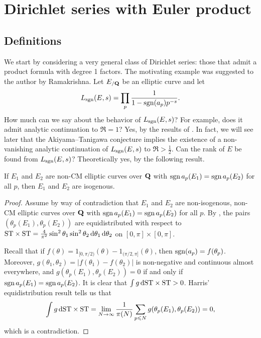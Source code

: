 
\chapter{Dirichlet series with Euler product}\label{ch:Dirichlet-series}





\section{Definitions}

We start by considering a very general class of Dirichlet series: those that 
admit a product formula with degree 1 factors. The motivating example was 
suggested to the author by Ramakrishna. Let $E_{/\mathbf{Q}}$ be an elliptic 
curve and let 
\[
	L_{\operatorname{sgn}}(E,s) = \prod_p \frac{1}{1-\operatorname{sgn}(a_p) p^{-s}} .
\]
How much can we say about the behavior of $L_{\operatorname{sgn}}(E,s)$? For example, does it 
admit analytic continuation to $\Re = 1$? Yes, by the results of 
\cite[A.2]{serre-1989}. In fact, we will see later that the Akiyama--Tanigawa 
conjecture implies the existence of a non-vanishing analytic continuation of 
$L_{\operatorname{sgn}}(E,s)$ to $\Re > \frac 1 2$. Can the rank of $E$ be 
found from $L_{\operatorname{sgn}}(E,s)$? Theoretically yes, by the following result. 

\begin{theorem}
If $E_1$ and $E_2$ are non-CM elliptic curves over $\mathbf{Q}$ with 
$\operatorname{sgn} a_p(E_1) = \operatorname{sgn} a_p(E_2)$ for all $p$, then $E_1$ and $E_2$ are 
isogenous.
\end{theorem}
\begin{proof}
Assume by way of contradiction that $E_1$ and $E_2$ are non-isogenous, non-CM 
elliptic curves over $\mathbf{Q}$ with $\operatorname{sgn} a_p(E_1) = \operatorname{sgn} a_p(E_2)$ for all $p$. By 
\cite[5.4]{harris-2009}, the pairs $(\theta_p(E_1),\theta_p(E_2))$ are 
equidistributed with respect to 
$\mathrm{ST}\times \mathrm{ST} = \frac{4}{\pi^2} \sin^2\theta_1\sin^2\theta_2\, \mathrm{d}\theta_1\, \mathrm{d}\theta_2$ 
on $[0,\pi]\times [0,\pi]$. 

Recall that if $f(\theta) = 1_{[0,\pi/2)}(\theta) - 1_{(\pi/2,\pi]}(\theta)$, 
then $\operatorname{sgn}(a_p) = f(\theta_p)$. Moreover, 
$g(\theta_1,\theta_2) = |f(\theta_1) - f(\theta_2)|$ is non-negative and 
continuous almost everywhere, and $g(\theta_p(E_1),\theta_p(E_2)) = 0$ if and 
only if $\operatorname{sgn} a_p(E_1) = \operatorname{sgn} a_p(E_2)$. It is clear that 
$\int g\, \mathrm{d} \mathrm{ST}\times \mathrm{ST} > 0$. Harris' equidistribution result tells us that 
\[
	\int g\, \mathrm{d} \mathrm{ST}\times\mathrm{ST} = \lim_{N\to \infty} \frac{1}{\pi(N)} \sum_{p\leqslant N} g(\theta_p(E_1),\theta_p(E_2)) = 0 ,
\]
which is a contradiction. 
\end{proof}

